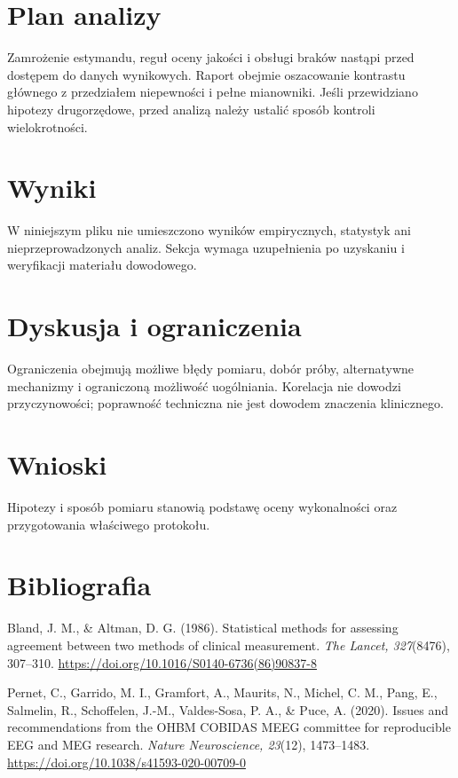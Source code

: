 \documentclass[11pt,a4paper]{article}
\begin{document}
\section{Plan analizy}

Zamrożenie estymandu, reguł oceny jakości i obsługi braków nastąpi przed dostępem do danych wynikowych. Raport obejmie oszacowanie kontrastu głównego z przedziałem niepewności i pełne mianowniki. Jeśli przewidziano hipotezy drugorzędowe, przed analizą należy ustalić sposób kontroli wielokrotności.

\section{Wyniki}

W niniejszym pliku nie umieszczono wyników empirycznych, statystyk ani nieprzeprowadzonych analiz. Sekcja wymaga uzupełnienia po uzyskaniu i weryfikacji materiału dowodowego.

\section{Dyskusja i ograniczenia}

Ograniczenia obejmują możliwe błędy pomiaru, dobór próby, alternatywne mechanizmy i ograniczoną możliwość uogólniania. Korelacja nie dowodzi przyczynowości; poprawność techniczna nie jest dowodem znaczenia klinicznego.

\section{Wnioski}

Hipotezy i sposób pomiaru stanowią podstawę oceny wykonalności oraz przygotowania właściwego protokołu.

\section*{Bibliografia}

{\setlength{\parindent}{0pt}
\setlength{\parskip}{5pt}
\hangindent=1.27cm
Bland, J. M., \& Altman, D. G. (1986). Statistical methods for assessing agreement between two methods of clinical measurement. \textit{The Lancet, 327}(8476), 307--310. \url{https://doi.org/10.1016/S0140-6736(86)90837-8}\par
\hangindent=1.27cm
Pernet, C., Garrido, M. I., Gramfort, A., Maurits, N., Michel, C. M., Pang, E., Salmelin, R., Schoffelen, J.-M., Valdes-Sosa, P. A., \& Puce, A. (2020). Issues and recommendations from the OHBM COBIDAS MEEG committee for reproducible EEG and MEG research. \textit{Nature Neuroscience, 23}(12), 1473--1483. \url{https://doi.org/10.1038/s41593-020-00709-0}\par
}
\end{document}
